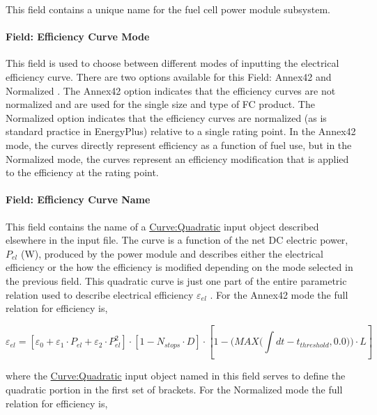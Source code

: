 This field contains a unique name for the fuel cell power module subsystem.

\paragraph{Field: Efficiency Curve Mode}\label{field-efficiency-curve-mode}

This field is used to choose between different modes of inputting the electrical efficiency curve. There are two options available for this Field: Annex42 and Normalized . The Annex42 option indicates that the efficiency curves are not normalized and are used for the single size and type of FC product. The Normalized option indicates that the efficiency curves are normalized (as is standard practice in EnergyPlus) relative to a single rating point. In the Annex42 mode, the curves directly represent efficiency as a function of fuel use, but in the Normalized mode, the curves represent an efficiency modification that is applied to the efficiency at the rating point.

\paragraph{Field: Efficiency Curve Name}\label{field-efficiency-curve-name}

This field contains the name of a \hyperref[curvequadratic]{Curve:Quadratic} input object described elsewhere in the input file. The curve is a function of the net DC electric power, \({P_{el}}\) (W), produced by the power module and describes either the electrical efficiency or the how the efficiency is modified depending on the mode selected in the previous field. This quadratic curve is just one part of the entire parametric relation used to describe electrical efficiency \({\varepsilon_{el}}\) . For the Annex42 mode the full relation for efficiency is,

\begin{equation}
{\varepsilon_{el}} = \left[ {{\varepsilon_0} + {\varepsilon_1} \cdot {P_{el}} + {\varepsilon_2} \cdot P_{el}^2} \right] \cdot \left[ {1 - {N_{stops}} \cdot D} \right] \cdot \left[ {1 - (MAX(\int\limits_{} {dt - {t_{threshold}},0.0))}  \cdot L} \right]
\end{equation}

where the \hyperref[curvequadratic]{Curve:Quadratic} input object named in this field serves to define the quadratic portion in the first set of brackets. For the Normalized mode the full relation for efficiency is,

